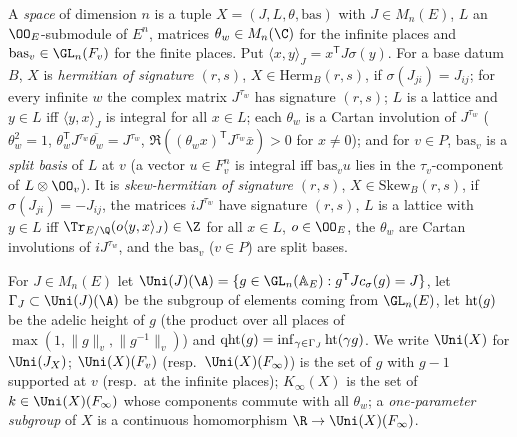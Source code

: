 \begin{definition}\label{pf:thmK:def:spaces}
A \emph{space} of dimension $n$ is a tuple $X=(J,L,\theta,\mathrm{bas})$ with $J\in M_n(E)$, $L$ an $\OO_E$-submodule
of $E^n$, matrices $\theta_w\in M_n(\C)$ for the infinite places and $\mathrm{bas}_v\in\GL_n(F_v)$ for the finite
places. Put $\langle x,y\rangle_J=x^{\mathsf T}J\sigma(y)$. For a base datum $B$, $X$ is \emph{hermitian of signature
$(r,s)$}, $X\in\mathrm{Herm}_B(r,s)$, if $\sigma(J_{ji})=J_{ij}$; for every infinite $w$ the complex matrix $J^{\tau_w}$
has signature $(r,s)$; $L$ is a lattice and $y\in L$ iff $\langle y,x\rangle_J$ is integral for all $x\in L$; each
$\theta_w$ is a Cartan involution of $J^{\tau_w}$ ($\theta_w^2=1$, $\theta_w^{\mathsf T}J^{\tau_w}\overline{\theta_w}=
J^{\tau_w}$, $\Re((\theta_wx)^{\mathsf T}J^{\tau_w}\bar x)>0$ for $x\ne0$); and for $v\in P$, $\mathrm{bas}_v$ is a
\emph{split basis} of $L$ at $v$ (a vector $u\in F_v^n$ is integral iff $\mathrm{bas}_vu$ lies in the $\tau_v$-component of
$L\otimes\OO_v$). It is \emph{skew-hermitian of signature $(r,s)$}, $X\in\mathrm{Skew}_B(r,s)$, if
$\sigma(J_{ji})=-J_{ij}$, the matrices $iJ^{\tau_w}$ have signature $(r,s)$, $L$ is a lattice with $y\in L$ iff
$\Tr_{E/\Q}(o\langle y,x\rangle_J)\in\Z$ for all $x\in L$, $o\in\OO_E$, the $\theta_w$ are Cartan involutions of
$iJ^{\tau_w}$, and the $\mathrm{bas}_v$ ($v\in P$) are split bases.

For $J\in M_n(E)$ let $\Uni(J)(\A)=\{g\in\GL_n(\thmKAE):g^{\mathsf T}Jc_\sigma(g)=J\}$, let $\Gamma_J\subset\Uni(J)(\A)$
be the subgroup of elements coming from $\GL_n(E)$, let $\operatorname{ht}(g)$ be the adelic height of $g$ (the product over all
places of $\max(1,\|g\|_v,\|g^{-1}\|_v)$) and $\operatorname{qht}(g)=\inf_{\gamma\in\Gamma_J}\operatorname{ht}(\gamma g)$. We write
$\Uni(X)$ for $\Uni(J_X)$; $\Uni(X)(F_v)$ (resp.\ $\Uni(X)(F_\infty)$) is the set of $g$ with $g-1$ supported at $v$
(resp.\ at the infinite places); $K_\infty(X)$ is the set of $k\in\Uni(X)(F_\infty)$ whose components commute with all
$\theta_w$; a \emph{one-parameter subgroup} of $X$ is a continuous homomorphism $\R\to\Uni(X)(F_\infty)$.
\end{definition}

